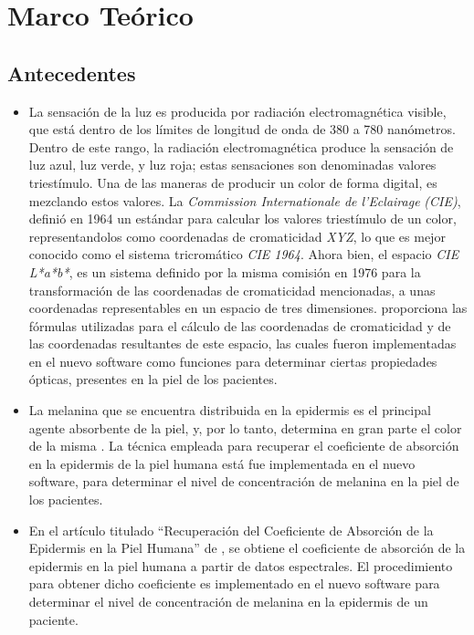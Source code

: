 \chapter{\label{cap:2}Marco Te\'{o}rico}

	\section{Antecedentes}	
		\begin{itemize}
		
			\item
				La sensaci\'{o}n de la luz es producida por radiaci\'{o}n electromagn\'{e}tica visible, que est\'{a} dentro de los l\'{i}mites de longitud de onda de 380 a 780 nan\'{o}metros. Dentro de este rango, la radiaci\'{o}n electromagn\'{e}tica produce la sensaci\'{o}n de luz azul, luz verde, y luz roja; estas sensaciones son denominadas valores triest\'{i}mulo. Una de las maneras de producir un color de forma digital, es mezclando estos valores. La \textit{\mbox{Commission} Internationale de l'Eclairage} \textit{(CIE)}, defini\'{o} en 1964 un est\'{a}ndar para calcular los valores triest\'{i}mulo de un color, representandolos como coordenadas de cromaticidad \textit{XYZ}, lo que es mejor conocido como el sistema tricrom\'{a}tico \textit{CIE 1964}. Ahora bien, el espacio \textit{CIE L*a*b*}, es un sistema definido por la misma comisi\'{o}n en 1976 para la \mbox{transformaci\'{o}n} de las coordenadas de cromaticidad mencionadas, a unas coordenadas representables en un espacio de tres dimensiones. \cite{Schanda} proporciona las f\'{o}rmulas utilizadas para el c\'{a}lculo de las coordenadas de cromaticidad y de las coordenadas resultantes de este espacio, las cuales fueron implementadas en el nuevo software como funciones para determinar ciertas propiedades \'{o}pticas, presentes en la piel de los pacientes.
			
			\item La melanina que se encuentra distribuida en la epidermis es el  principal agente absorbente de la piel, y, por lo tanto, determina en gran parte el color de la misma \cite{Narea}. La t\'{e}cnica empleada para recuperar el coeficiente de absorci\'{o}n en la epidermis de la piel humana \cite{Narea} est\'{a} fue implementada en el nuevo software, para determinar el nivel de concentraci\'{o}n de melanina en la piel de los pacientes.
			
			\item En el art\'{i}culo titulado ``Recuperaci\'{o}n del Coeficiente de Absorci\'{o}n de la Epidermis en la Piel Humana'' de \cite{Narea}, se obtiene el coeficiente de absorci\'{o}n de la epidermis en la piel humana a partir de datos espectrales. El procedimiento para obtener dicho coeficiente es implementado en el nuevo software para determinar el nivel de concentraci\'{o}n de melanina en la epidermis de un paciente.
			

\end{itemize}
